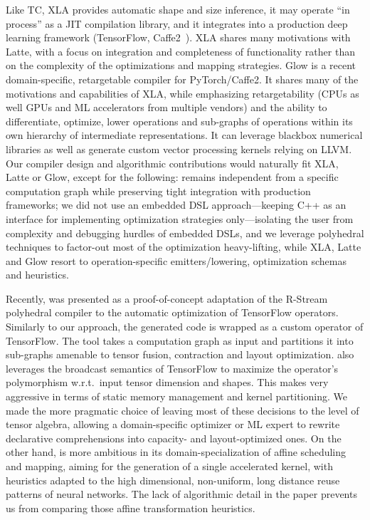 Like TC, XLA \cite{XLA} provides automatic shape and size inference,
it may operate ``in process'' as a JIT compilation library, and it
integrates into a production deep learning framework (TensorFlow,
Caffe2~\cite{Caffe2}). XLA shares many motivations with Latte, with a
focus on integration and completeness of functionality rather than on
the complexity of the optimizations and mapping strategies.  Glow
\cite{Glow} is a recent domain-specific, retargetable compiler for
PyTorch/Caffe2. It shares many of the motivations and capabilities of
XLA, while emphasizing retargetability (CPUs as well GPUs and ML
accelerators from multiple vendors) and the ability to differentiate,
optimize, lower operations and sub-graphs of operations within its own
hierarchy of intermediate representations. It can leverage blackbox
numerical libraries as well as generate custom vector processing
kernels relying on LLVM. Our compiler design and algorithmic
contributions would naturally fit XLA, Latte or Glow, except for the
following: \ourtoolkitname remains independent from a specific
computation graph while preserving tight integration with production
frameworks; we did not use an embedded DSL approach---keeping C++ as
an interface for implementing optimization strategies only---isolating
the user from complexity and debugging hurdles of embedded DSLs, and
we leverage polyhedral techniques to factor-out most of the
optimization heavy-lifting, while XLA, Latte and Glow resort to
operation-specific emitters/lowering, optimization schemas and heuristics.

Recently, \rstreamtf \cite{RStreamTF} was presented as a
proof-of-concept adaptation of the R-Stream polyhedral compiler to the
automatic optimization of TensorFlow operators. Similarly to our
approach, the generated code is wrapped as a custom operator of
TensorFlow. The tool takes a computation graph as input and partitions
it into sub-graphs amenable to tensor fusion, contraction and layout
optimization. \rstreamtf also leverages the broadcast semantics of
TensorFlow to maximize the operator's polymorphism w.r.t.\ input
tensor dimension and shapes. This makes \rstreamtf very aggressive in
terms of static memory management and kernel partitioning. We made the
more pragmatic choice of leaving most of these decisions to the level of
tensor algebra, allowing a domain-specific optimizer or ML expert to
rewrite declarative comprehensions into capacity- and layout-optimized
ones. On the other hand, \ourtoolkitname is more ambitious in its
domain-specialization of affine scheduling and mapping, aiming for the
generation of a single accelerated kernel, with heuristics adapted to
the high dimensional, non-uniform, long distance reuse patterns of neural
networks. The lack of algorithmic detail in the \rstreamtf paper
prevents us from
comparing those affine transformation heuristics.
